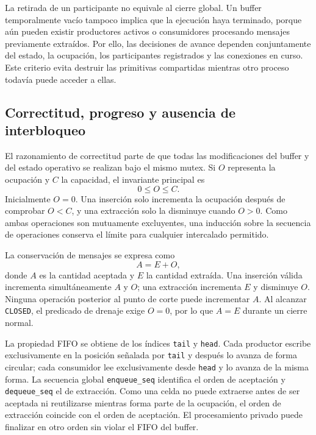 \documentclass[conference]{IEEEtran}
\begin{document}
La retirada de un participante no equivale al cierre global. Un buffer temporalmente vacío tampoco implica que la ejecución haya terminado, porque aún pueden existir productores activos o consumidores procesando mensajes previamente extraídos. Por ello, las decisiones de avance dependen conjuntamente del estado, la ocupación, los participantes registrados y las conexiones en curso. Este criterio evita destruir las primitivas compartidas mientras otro proceso todavía puede acceder a ellas.

\subsection{Correctitud, progreso y ausencia de interbloqueo}
El razonamiento de correctitud parte de que todas las modificaciones del buffer y del estado operativo se realizan bajo el mismo mutex. Si $O$ representa la ocupación y $C$ la capacidad, el invariante principal es
\begin{equation}
0 \leq O \leq C.
\end{equation}
Inicialmente $O=0$. Una inserción solo incrementa la ocupación después de comprobar $O<C$, y una extracción solo la disminuye cuando $O>0$. Como ambas operaciones son mutuamente excluyentes, una inducción sobre la secuencia de operaciones conserva el límite para cualquier intercalado permitido.

La conservación de mensajes se expresa como
\begin{equation}
A=E+O,
\end{equation}
donde $A$ es la cantidad aceptada y $E$ la cantidad extraída. Una inserción válida incrementa simultáneamente $A$ y $O$; una extracción incrementa $E$ y disminuye $O$. Ninguna operación posterior al punto de corte puede incrementar $A$. Al alcanzar \texttt{CLOSED}, el predicado de drenaje exige $O=0$, por lo que $A=E$ durante un cierre normal.

La propiedad FIFO se obtiene de los índices \texttt{tail} y \texttt{head}. Cada productor escribe exclusivamente en la posición señalada por \texttt{tail} y después lo avanza de forma circular; cada consumidor lee exclusivamente desde \texttt{head} y lo avanza de la misma forma. La secuencia global \texttt{enqueue\_seq} identifica el orden de aceptación y \texttt{dequeue\_seq} el de extracción. Como una celda no puede extraerse antes de ser aceptada ni reutilizarse mientras forma parte de la ocupación, el orden de extracción coincide con el orden de aceptación. El procesamiento privado puede finalizar en otro orden sin violar el FIFO del buffer.
\end{document}
